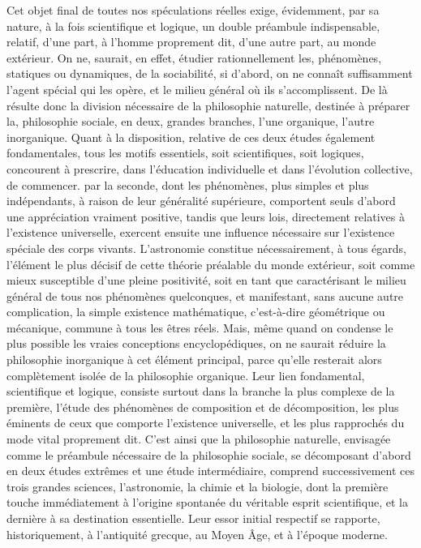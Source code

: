 \documentclass[french,twoside]{book} %
\begin{document}
Cet objet final de toutes nos spéculations réelles exige, évidemment, par sa nature, à la fois scientifique et logique, un double préambule indispensable, relatif, d’une part, à l’homme proprement dit, d’une autre part, au monde extérieur. On ne, saurait, en effet, étudier rationnellement les, phénomènes, statiques ou dynamiques, de la sociabilité, si d’abord, on ne connaît suffisamment l’agent spécial qui les opère, et le milieu général où ils s’accomplissent. De là résulte donc la division nécessaire de la philosophie naturelle, destinée à préparer la, philosophie sociale, en deux, grandes branches, l’une organique, l’autre inorganique. Quant à la disposition, relative de ces deux études également fondamentales, tous les motifs essentiels, soit scientifiques, soit logiques, concourent à prescrire, dans l’éducation individuelle et dans l’évolution collective, de commencer. par la seconde, dont les phénomènes, plus simples et plus indépendants, à raison de leur généralité supérieure, comportent seuls d’abord une appréciation vraiment positive, tandis que leurs lois, directement relatives à l’existence universelle, exercent ensuite une influence nécessaire sur l’existence spéciale des corps vivants. L’astronomie constitue nécessairement, à tous égards, l’élément le plus décisif de cette théorie préalable du monde extérieur, soit comme mieux susceptible d’une pleine positivité, soit en tant que caractérisant le milieu général de tous nos phénomènes quelconques, et manifestant, sans aucune autre complication, la simple existence mathématique, c’est-à-dire géométrique ou mécanique, commune à tous les êtres réels. Mais, même quand on condense le plus possible les vraies conceptions encyclopédiques, on ne saurait réduire la philosophie inorganique à cet élément principal, parce qu’elle resterait alors complètement isolée de la philosophie organique. Leur lien fondamental, scientifique et logique, consiste surtout dans la branche la plus complexe de la première, l’étude des phénomènes de composition et de décomposition, les plus éminents de ceux que comporte l’existence universelle, et les plus rapprochés du mode vital proprement dit. C’est ainsi que la philosophie naturelle, envisagée comme le préambule nécessaire de la philosophie sociale, se décomposant d’abord en deux études extrêmes et une étude intermédiaire, comprend successivement ces trois grandes sciences, l’astronomie, la chimie et la biologie, dont la première touche immédiatement à l’origine spontanée du véritable esprit scientifique, et la dernière à sa destination essentielle. Leur essor initial respectif se rapporte, historiquement, à l’antiquité grecque, au Moyen Âge, et à l’époque moderne.\par
\end{document}
